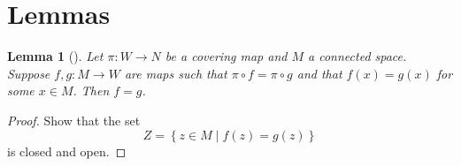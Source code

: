 \documentclass[reqno]{amsart}
\newtheorem{lemma}[theorem]{Lemma}
\theoremstyle{definition}
\theoremstyle{remark}
\begin{document}
\section{Lemmas}

\begin{lemma}[]\label{Lemma:XIOOQLSJ}
    Let $\pi \colon W \to N$ be a covering map and
    $M$ a connected space. Suppose
    $f,g \colon M \to W$ are maps such that
    $\pi \circ f = \pi \circ g$ and that
    $f(x) = g(x)$ for some $x \in M$. Then
    $f = g$.
\end{lemma}

\begin{proof}
    Show that the set
    \[
    Z = \left\{ z \in M  \mid f(z) = g(z)\right\} 
    \] 
    is closed and open.
\end{proof}




\newpage
\printbibliography
\end{document}
